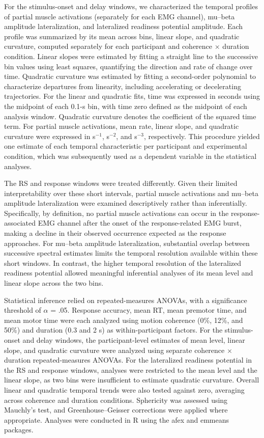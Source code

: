\documentclass[a4paper,11pt]{article}
\theoremstyle{definition}
\newcommand{\1}{\mathbbm{1}}
\begin{document}
For the stimulus-onset and delay windows, we characterized the temporal profiles of partial muscle activations (separately for each EMG channel), mu--beta amplitude lateralization, and lateralized readiness potential amplitude. Each profile was summarized by its mean across bins, linear slope, and quadratic curvature, computed separately for each participant and coherence $\times$ duration condition. Linear slopes were estimated by fitting a straight line to the successive bin values using least squares, quantifying the direction and rate of change over time. Quadratic curvature was estimated by fitting a second-order polynomial to characterize departures from linearity, including accelerating or decelerating trajectories. For the linear and quadratic fits, time was expressed in seconds using the midpoint of each 0.1-s bin, with time zero defined as the midpoint of each analysis window. Quadratic curvature denotes the coefficient of the squared time term. For partial muscle activations, mean rate, linear slope, and quadratic curvature were expressed in s$^{-1}$, s$^{-2}$, and s$^{-3}$, respectively. This procedure yielded one estimate of each temporal characteristic per participant and experimental condition, which was subsequently used as a dependent variable in the statistical analyses.

The RS and response windows were treated differently. Given their limited interpretability over these short intervals, partial muscle activations and mu--beta amplitude lateralization were examined descriptively rather than inferentially. Specifically, by definition, no partial muscle activations can occur in the response-associated EMG channel after the onset of the response-related EMG burst, making a decline in their observed occurrence expected as the response approaches. For mu--beta amplitude lateralization, substantial overlap between successive spectral estimates limits the temporal resolution available within these short windows. In contrast, the higher temporal resolution of the lateralized readiness potential allowed meaningful inferential analyses of its mean level and linear slope across the two bins.

Statistical inference relied on repeated-measures ANOVAs, with a significance threshold of $\alpha$ = .05. Response accuracy, mean RT, mean premotor time, and mean motor time were each analyzed using motion coherence (0\%, 12\%, and 50\%) and duration (0.3 and 2 s) as within-participant factors. For the stimulus-onset and delay windows, the participant-level estimates of mean level, linear slope, and quadratic curvature were analyzed using separate coherence $\times$ duration repeated-measures ANOVAs. For the lateralized readiness potential in the RS and response windows, analyses were restricted to the mean level and the linear slope, as two bins were insufficient to estimate quadratic curvature. Overall linear and quadratic temporal trends were also tested against zero, averaging across coherence and duration conditions. Sphericity was assessed using Mauchly's test, and Greenhouse--Geisser corrections were applied where appropriate. Analyses were conducted in R using the afex and emmeans packages.
\end{document}
